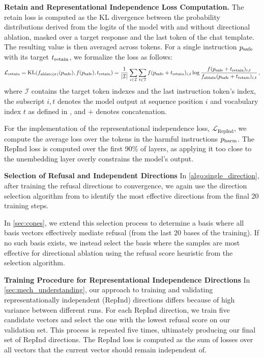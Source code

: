 \textbf{Retain and Representational Independence Loss Computation.}
The retain loss is computed as the KL divergence between the probability distributions derived from the logits of the model with and without directional ablation, masked over a target response and the last token of the chat template. The resulting value is then averaged across tokens. For a single instruction ${{p}_{\text{safe}}}$ with its target ${t_{\text{retain}}}$, we formalize the loss as follows: 
\begin{equation*}
\mathcal{L}_{\text{retain}} = {\text{KL}}(f_{\text{ablate}({{\bm{r}}})}({{p}_{\text{safe}}}), f({{p}_{\text{safe}}}), {t_{\text{retain}}}) = \frac{1}{|\mathcal{I}|} \sum_{i \in \mathcal{I}} \sum_{t \in {\mathbb{T}}} f({{p}_{\text{safe}}} + {t_{\text{retain}}})_{i,t} \log \frac{f({{p}_{\text{safe}}} + {t_{\text{retain}}})_{i,t}}{f_{\text{ablate}}({{p}_{\text{safe}}} + {t_{\text{retain}}})_{i,t}}\,,
\end{equation*}
where $\mathcal{I}$ contains the target token indexes and the last instruction token's index, the subscript ${i,t}$ denotes the model output at sequence position $i$ and vocabulary index $t$ as defined in , and $+$ denotes concatenation.

For the implementation of the representational independence loss, $\mathcal{L}_{\text{RepInd}}$, we compute the average loss over the tokens in the harmful instructions ${{p}_{\text{harm}}}$. The RepInd loss is computed over the first 90\% of layers, as applying it too close to the unembedding layer overly constrains the model’s output.

\textbf{Selection of Refusal and Independent Directions}
In \cref{algo:single_direction}, after training the refusal directions to convergence, we again use the direction selection algorithm from \citet{arditi2024refusallanguagemodelsmediated} to identify the most effective directions from the final 20 training steps. 

In \cref{sec:cones}, we extend this selection process to determine a basis where all basis vectors effectively mediate refusal (from the last 20 bases of the training). If no such basis exists, we instead select the basis where the samples are most effective for directional ablation using the refusal score heuristic from the selection algorithm.

\textbf{Training Procedure for Representational Independence Directions}
In \cref{sec:mech_understanding}, our approach to training and validating representationally independent (RepInd) directions differs because of high variance between different runs. For each RepInd direction, we train five candidate vectors and select the one with the lowest refusal score on our validation set. This process is repeated five times, ultimately producing our final set of RepInd directions. The RepInd loss is computed as the sum of losses over all vectors that the current vector should remain independent of.
















